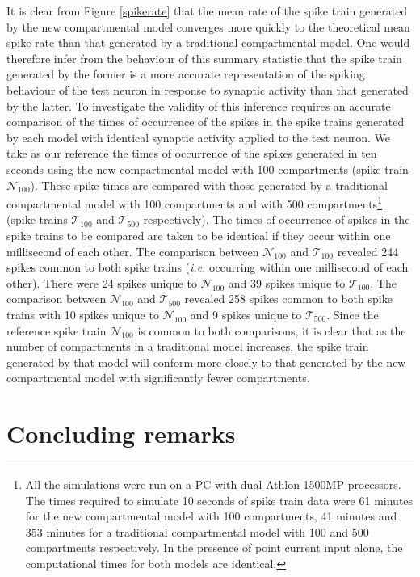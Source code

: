 It is clear from Figure \ref{spikerate} that the mean rate of the
spike train generated by the new compartmental model converges
more quickly to the theoretical mean spike rate than that
generated by a traditional compartmental model. One would
therefore infer from the behaviour of this summary statistic that
the spike train generated by the former is a more accurate
representation of the spiking behaviour of the test neuron in
response to synaptic activity than that generated by the latter.
To investigate the validity of this inference requires an accurate
comparison of the times of occurrence of the spikes in the spike
trains generated by each model with identical synaptic activity
applied to the test neuron. We take as our reference the times of
occurrence of the spikes generated in ten seconds using the new
compartmental model with 100 compartments (spike train
$\mathcal{N}_{100}$). These spike times are compared with those
generated by a traditional compartmental model with 100
compartments and with 500 compartments\footnote{All the
simulations were run on a PC with dual Athlon 1500MP processors.
The times required to simulate 10 seconds of spike train data were
61 minutes for the new compartmental model with 100 compartments,
41 minutes and 353 minutes for a traditional compartmental model
with 100 and 500 compartments respectively. In the presence of
point current input alone, the computational times for both models
are identical.} (spike trains $\mathcal{T}_{100}$ and
$\mathcal{T}_{500}$ respectively). The times of occurrence of
spikes in the spike trains to be compared are taken to be
identical if they occur within one millisecond of each other. The
comparison between $\mathcal{N}_{100}$ and $\mathcal{T}_{100}$
revealed 244 spikes common to both spike trains (\emph{i.e.}
occurring within one millisecond of each other). There were 24
spikes unique to $\mathcal{N}_{100}$ and 39 spikes unique to
$\mathcal{T}_{100}$. The comparison between $\mathcal{N}_{100}$
and $\mathcal{T}_{500}$ revealed 258 spikes common to both spike
trains with 10 spikes unique to $\mathcal{N}_{100}$ and 9 spikes
unique to $\mathcal{T}_{500}$. Since the reference spike train
$\mathcal{N}_{100}$ is common to both comparisons, it is clear
that as the number of compartments in a traditional model
increases, the spike train generated by that model will conform
more closely to that generated by the new compartmental model with
significantly fewer compartments.

\section{Concluding remarks}

